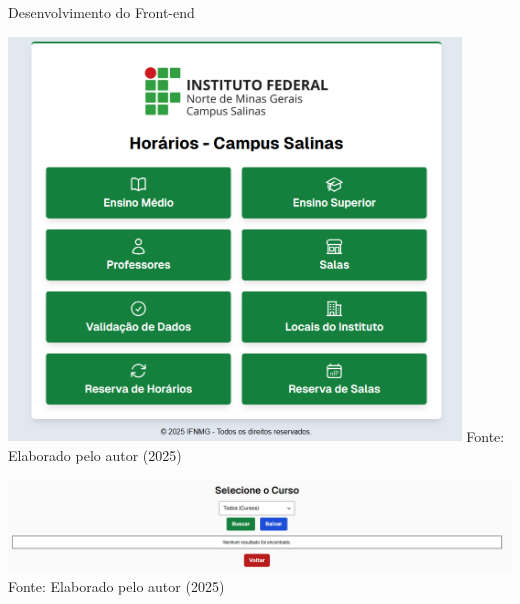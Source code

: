 \begin{frame}{Desenvolvimento do Front-end}
    \begin{minipage}{0.48\textwidth}
        \centering
        \includegraphics[width=0.9\textwidth]{figuras/front-1.png}
        \footnotesize Fonte: Elaborado pelo autor (2025)
    \end{minipage}
    \hfill
    \begin{minipage}{0.48\textwidth}
        \centering
        \includegraphics[width=1\textwidth]{figuras/front-2.png}
        \footnotesize Fonte: Elaborado pelo autor (2025)
    \end{minipage}
\end{frame}

